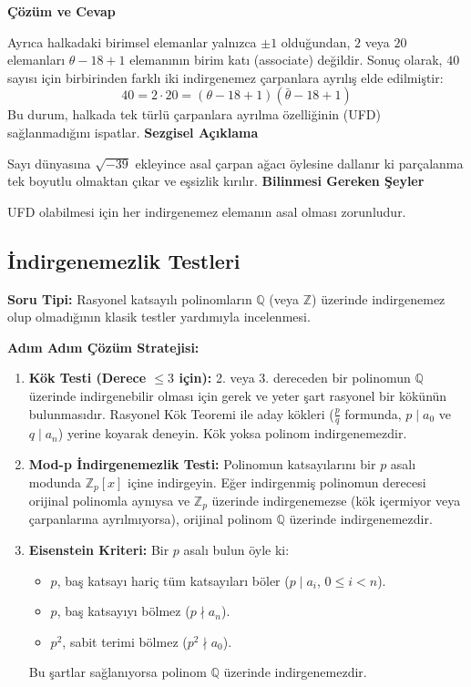 \documentclass[11pt, a4paper]{article}
\newenvironment{cozum}{
    \vspace{0.5cm}
    \noindent\textcolor{green!60!black}{\faCheckCircle\enspace \textbf{\Large Çözüm ve Cevap}}\par\vspace{0.2cm}
}{}
\newenvironment{sezgisel}{
    \vspace{0.5cm}
    \noindent\textcolor{orange!80!black}{\faLightbulb\enspace \textbf{\Large Sezgisel Açıklama}}\par\vspace{0.2cm}
    \itshape
}{}
\newenvironment{bilgi}{
    \vspace{0.5cm}
    \noindent\textcolor{red!70!black}{\faExclamationTriangle\enspace \textbf{\Large Bilinmesi Gereken Şeyler}}\par\vspace{0.2cm}
}{}
\begin{document}
\begin{cozum}
Ayrıca halkadaki birimsel elemanlar yalnızca $\pm 1$ olduğundan, $2$ veya $20$ elemanları $\theta - 18 + 1$ elemanının birim katı (associate) değildir. Sonuç olarak, $40$ sayısı için birbirinden farklı iki indirgenemez çarpanlara ayrılış elde edilmiştir:
\[ 40 = 2 \cdot 20 = (\theta - 18 + 1)(\bar{\theta} - 18 + 1) \]
Bu durum, halkada tek türlü çarpanlara ayrılma özelliğinin (UFD) sağlanmadığını ispatlar.
\end{cozum}
\begin{sezgisel}
Sayı dünyasına $\sqrt{-39}$ ekleyince asal çarpan ağacı öylesine dallanır ki parçalanma tek boyutlu olmaktan çıkar ve eşsizlik kırılır.
\end{sezgisel}
\begin{bilgi}
UFD olabilmesi için her indirgenemez elemanın asal olması zorunludur.
\end{bilgi}

\subsection{İndirgenemezlik Testleri}

\begin{konubox}[title={\faGraduationCap\enspace Soru Tipi ve Adım Adım Çözüm Stratejisi}]
\textbf{Soru Tipi:} Rasyonel katsayılı polinomların $\mathbb{Q}$ (veya $\mathbb{Z}$) üzerinde indirgenemez olup olmadığının klasik testler yardımıyla incelenmesi.

\textbf{Adım Adım Çözüm Stratejisi:}
\begin{enumerate}
    \item \textbf{Kök Testi (Derece $\le 3$ için):} 2. veya 3. dereceden bir polinomun $\mathbb{Q}$ üzerinde indirgenebilir olması için gerek ve yeter şart rasyonel bir kökünün bulunmasıdır. Rasyonel Kök Teoremi ile aday kökleri ($\frac{p}{q}$ formunda, $p \mid a_0$ ve $q \mid a_n$) yerine koyarak deneyin. Kök yoksa polinom indirgenemezdir.
    \item \textbf{Mod-p İndirgenemezlik Testi:} Polinomun katsayılarını bir $p$ asalı modunda $\mathbb{Z}_p[x]$ içine indirgeyin. Eğer indirgenmiş polinomun derecesi orijinal polinomla aynıysa ve $\mathbb{Z}_p$ üzerinde indirgenemezse (kök içermiyor veya çarpanlarına ayrılmıyorsa), orijinal polinom $\mathbb{Q}$ üzerinde indirgenemezdir.
    \item \textbf{Eisenstein Kriteri:} Bir $p$ asalı bulun öyle ki:
    \begin{itemize}
        \item $p$, baş katsayı hariç tüm katsayıları böler ($p \mid a_i$, $0 \le i < n$).
        \item $p$, baş katsayıyı bölmez ($p \nmid a_n$).
        \item $p^2$, sabit terimi bölmez ($p^2 \nmid a_0$).
    \end{itemize}
    Bu şartlar sağlanıyorsa polinom $\mathbb{Q}$ üzerinde indirgenemezdir.
\end{enumerate}
\end{konubox}
\newpage
\end{document}
